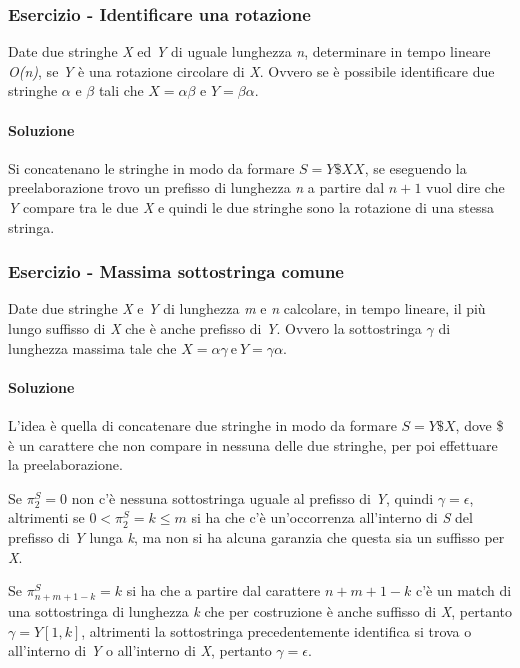 \subsubsection{Esercizio - Identificare una rotazione}

Date due stringhe \textit{X} ed \textit{Y} di uguale lunghezza \textit{n}, determinare in tempo lineare \textit{O(n)}, se \textit{Y} è una rotazione circolare di \textit{X}.
Ovvero se è possibile identificare due stringhe $ \alpha $ e $ \beta $ tali che $ X = \alpha\beta $ e $ Y = \beta\alpha $.

\paragraph{Soluzione}

Si concatenano le stringhe in modo da formare $ S = Y\$XX $, se eseguendo la preelaborazione trovo un prefisso di lunghezza \textit{n} a partire dal $n+1$ vuol dire che \textit{Y} compare tra le due \textit{X} e quindi le due stringhe sono la rotazione di una stessa stringa.

\subsubsection{Esercizio - Massima sottostringa comune}

Date due stringhe \textit{X} e \textit{Y} di lunghezza \textit{m} e \textit{n} calcolare, in tempo lineare, il più lungo suffisso di \textit{X} che è anche prefisso di \textit{Y}. 
Ovvero la sottostringa $ \gamma $ di lunghezza massima tale che $ X = \alpha\gamma \: \text{e} \: Y = \gamma\alpha$.

\paragraph{Soluzione}

L'idea è quella di concatenare due stringhe in modo da formare $ S= Y\$X $, dove \$ è un carattere che non compare in nessuna delle due stringhe, per poi effettuare la preelaborazione.

Se $ \pi_2^S = 0$ non c'è nessuna sottostringa uguale al prefisso di \textit{Y}, quindi $ \gamma = \epsilon $, altrimenti se  $ 0 < \pi_2^S = k \leq m$ si ha che c'è un'occorrenza all'interno di \textit{S} del prefisso di \textit{Y} lunga \textit{k}, ma non si ha alcuna garanzia che questa sia un suffisso per \textit{X}.

Se  $ \pi_{n+m+1-k}^S = k$ si ha che a partire dal carattere $ n+m+1-k $ c'è un match di una sottostringa di lunghezza \textit{k} che per costruzione è anche suffisso di \textit{X}, pertanto $ \gamma = Y[1,k] $, altrimenti la sottostringa precedentemente identifica si trova o all'interno di \textit{Y} o all'interno di \textit{X}, pertanto $ \gamma = \epsilon $.



